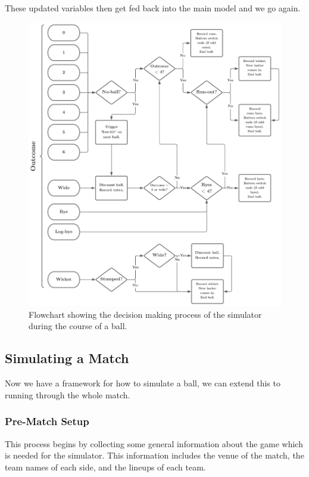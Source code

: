 These updated variables then get fed back into the main model and we go again.

\begin{figure}
    \centering
    \includegraphics[width=1\columnwidth]{images/cricket flowchart (2).png}
    \caption{Flowchart showing the decision making process of the simulator during the course of a ball.}
    \label{fig: flowchart}
\end{figure}

\subsection{Simulating a Match}

Now we have a framework for how to simulate a ball, we can extend this to running through the whole match. 

\subsubsection{Pre-Match Setup}

This process begins by collecting some general information about the game which is needed for the simulator. This information includes the venue of the match, the team names of each side, and the lineups of each team. 

